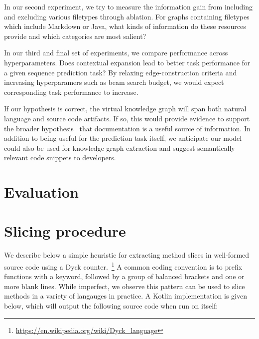 \documentclass[sigconf,review,anonymous]{acmart}
\begin{document}
  In our second experiment, we try to measure the information gain from including and excluding various filetypes through ablation. For graphs containing filetypes which include Markdown or Java, what kinds of information do these resources provide and which categories are most salient?


  In our third and final set of experiments, we compare performance across hyperparameters. Does contextual expansion lead to better task performance for a given sequence prediction task? By relaxing edge-construction criteria and increasing hyperparamers such as beam search budget, we would expect corresponding task performance to increase.

  If our hypothesis is correct, the virtual knowledge graph will span both natural language and source code artifacts. If so, this would provide evidence to support the broader hypothesis~\citep{guo2017semantically} that documentation is a useful source of information. In addition to being useful for the prediction task itself, we anticipate our model could also be used for knowledge graph extraction and suggest semantically relevant code snippets to developers.



  \pagebreak
  \section{Evaluation}\label{sec:evaluation}

  
  
  \pagebreak
  \appendix

  \section{Slicing procedure}

  We describe below a simple heuristic for extracting method slices in well-formed source code using a Dyck counter.~\footnote{\url{https://en.wikipedia.org/wiki/Dyck\_language}} A common coding convention is to prefix functions with a keyword, followed by a group of balanced brackets and one or more blank lines. While imperfect, we observe this pattern can be used to slice methods in a variety of langauges in practice. A Kotlin implementation is given below, which will output the following source code when run on itself:
\end{document}
